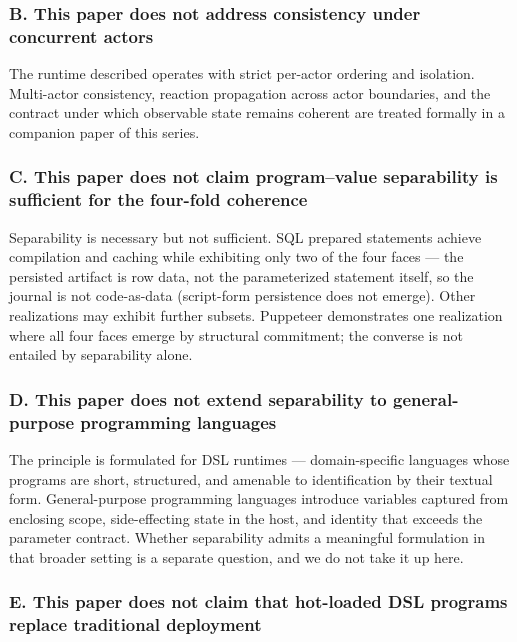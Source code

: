 \documentclass[
]{article}
\begin{document}
\subsubsection{B. This paper does not address consistency under
concurrent
actors}\label{b.-this-paper-does-not-address-consistency-under-concurrent-actors}

The runtime described operates with strict per-actor ordering and
isolation. Multi-actor consistency, reaction propagation across actor
boundaries, and the contract under which observable state remains
coherent are treated formally in a companion paper of this series.

\subsubsection{C. This paper does not claim program--value separability
is sufficient for the four-fold
coherence}\label{c.-this-paper-does-not-claim-programvalue-separability-is-sufficient-for-the-four-fold-coherence}

Separability is necessary but not sufficient. SQL prepared statements
achieve compilation and caching while exhibiting only two of the four
faces --- the persisted artifact is row data, not the parameterized
statement itself, so the journal is not code-as-data (script-form
persistence does not emerge). Other realizations may exhibit further
subsets. Puppeteer demonstrates one realization where all four faces
emerge by structural commitment; the converse is not entailed by
separability alone.

\subsubsection{D. This paper does not extend separability to
general-purpose programming
languages}\label{d.-this-paper-does-not-extend-separability-to-general-purpose-programming-languages}

The principle is formulated for DSL runtimes --- domain-specific
languages whose programs are short, structured, and amenable to
identification by their textual form. General-purpose programming
languages introduce variables captured from enclosing scope,
side-effecting state in the host, and identity that exceeds the
parameter contract. Whether separability admits a meaningful formulation
in that broader setting is a separate question, and we do not take it up
here.

\subsubsection{E. This paper does not claim that hot-loaded DSL programs
replace traditional
deployment}\label{e.-this-paper-does-not-claim-that-hot-loaded-dsl-programs-replace-traditional-deployment}
\end{document}
